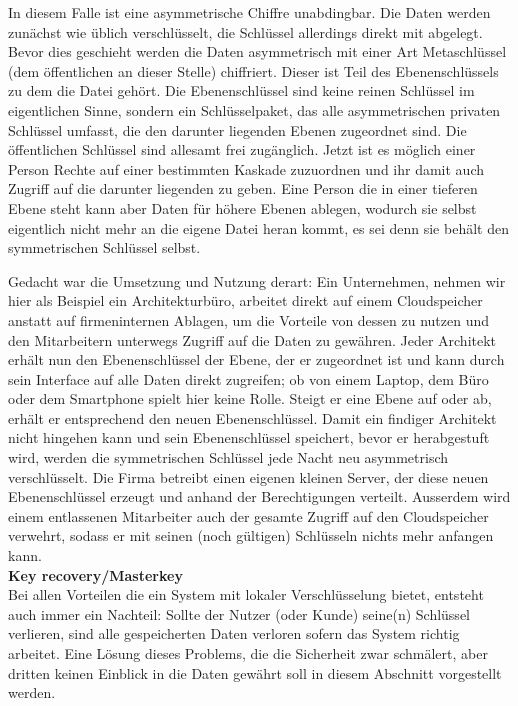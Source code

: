 \documentclass[12pt,a4paper,bibliography=totocnumbered,listof=totocnumbered]{scrartcl}
\begin{document}
In diesem Falle ist eine asymmetrische Chiffre unabdingbar. Die Daten werden zunächst wie üblich verschlüsselt, die Schlüssel allerdings direkt mit abgelegt. Bevor dies geschieht werden die Daten asymmetrisch mit einer Art Metaschlüssel (dem öffentlichen an dieser Stelle) chiffriert. Dieser ist Teil des Ebenenschlüssels zu dem die Datei gehört. Die Ebenenschlüssel sind keine reinen Schlüssel im eigentlichen Sinne, sondern ein Schlüsselpaket, das alle asymmetrischen privaten Schlüssel umfasst, die den darunter liegenden Ebenen zugeordnet sind. Die öffentlichen Schlüssel sind allesamt frei zugänglich. Jetzt ist es möglich einer Person Rechte auf einer bestimmten Kaskade zuzuordnen und ihr damit auch Zugriff auf die darunter liegenden zu geben. Eine Person die in einer tieferen Ebene steht kann aber Daten für höhere Ebenen ablegen, wodurch sie selbst eigentlich nicht mehr an die eigene Datei heran kommt, es sei denn sie behält den symmetrischen Schlüssel selbst.

Gedacht war die Umsetzung und Nutzung derart: Ein Unternehmen, nehmen wir hier als Beispiel ein Architekturbüro, arbeitet direkt auf einem Cloudspeicher anstatt auf firmeninternen Ablagen, um die Vorteile von dessen zu nutzen und den Mitarbeitern unterwegs Zugriff auf die Daten zu gewähren. Jeder Architekt erhält nun den Ebenenschlüssel der Ebene, der er zugeordnet ist und kann durch sein Interface auf alle Daten direkt zugreifen; ob von einem Laptop, dem Büro oder dem Smartphone spielt hier keine Rolle. Steigt er eine Ebene auf oder ab, erhält er entsprechend den neuen Ebenenschlüssel. Damit ein findiger Architekt nicht hingehen kann und sein Ebenenschlüssel speichert, bevor er herabgestuft wird, werden die symmetrischen Schlüssel jede Nacht neu asymmetrisch verschlüsselt. Die Firma betreibt einen eigenen kleinen Server, der diese neuen Ebenenschlüssel erzeugt und anhand der Berechtigungen verteilt. Ausserdem wird einem entlassenen Mitarbeiter auch der gesamte Zugriff auf den Cloudspeicher verwehrt, sodass er mit seinen (noch gültigen) Schlüsseln nichts mehr anfangen kann.
\\\textbf{Key recovery/Masterkey}\\
Bei allen Vorteilen die ein System mit lokaler Verschlüsselung bietet, entsteht auch immer ein Nachteil: Sollte der Nutzer (oder Kunde) seine(n) Schlüssel verlieren, sind alle gespeicherten Daten verloren sofern das System richtig arbeitet. Eine Lösung dieses Problems, die die Sicherheit zwar schmälert, aber dritten keinen Einblick in die Daten gewährt soll in diesem Abschnitt vorgestellt werden.
\end{document}
